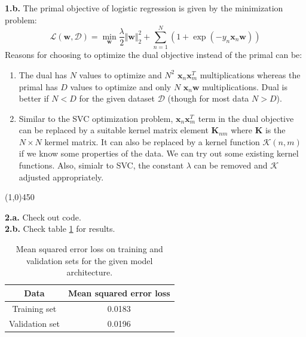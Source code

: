 \documentclass[11pt]{article}
\newcommand{\mbf}[1]{{\mathbf{#1}}}
\begin{document}
\textbf{1.b.}
The primal objective of logistic regression is given by the minimization problem:
$$
	\mathcal{L}(\mbf{w}, \mathcal{D}) = \min_{\mbf{w}} \frac{\lambda}{2} \Vert\mbf{w}\Vert_2^2 + \sum_{n=1}^{N} (1 + \exp(-y_n \mbf{x}_n \mbf{w}))
$$
Reasons for choosing to optimize the dual objective instead of the primal can be:
\begin{enumerate}
	\item The dual has $N$ values to optimize and $N^2$ $\mbf{x}_n\mbf{x}_m^T$ multiplications whereas the primal has $D$ values to optimize and only $N$ $\mbf{x}_n\mbf{w}$ multiplications. Dual is better if $N<D$ for the given dataset $\mathcal{D}$ (though for most data $N > D$).
	\item Similar to the SVC optimization problem, $\mbf{x}_n\mbf{x}_m^T$ term in the dual objective can be replaced by a suitable kernel matrix element $\mbf{K}_{nm}$ where $\mbf{K}$ is the $N \times N$ kermel matrix. It can also be replaced by a kernel function $\mathcal{K}(n, m)$ if we know some properties of the data. We can try out some existing kernel functions. Also, simialr to SVC, the constant $\lambda$ can be removed and $\mathcal{K}$ adjusted appropriately.
\end{enumerate}

\begin{center}
	\line(1,0){450}
\end{center}

\textbf{2.a.} Check out code. \\

\textbf{2.b.} Check table \ref{tab:loss_train_val_given_nn} for results.
\begin{table}[h!]
	\begin{center}
		\begin{tabular}{c|c} %
			\textbf{Data} & \textbf{Mean squared error loss}\\
			\hline
			Training set & 0.0183 \\
			Validation set & 0.0196 \\
		\end{tabular}
		\caption{Mean squared error loss on training and validation sets for the given model architecture.}
		\label{tab:loss_train_val_given_nn}
	\end{center}
\end{table}
\end{document}
